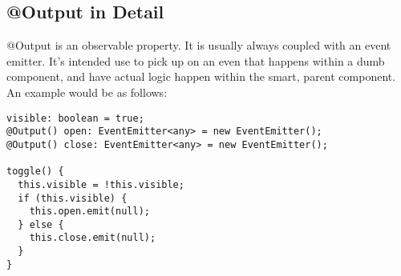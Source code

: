 \subsection{@Output in Detail}
@Output is an observable property. It is usually always coupled with an
event emitter. It's intended use to pick up on an even that happens within a
dumb component, and have actual logic happen within the smart, parent component.
An example would be as follows:
\begin{lstlisting}
visible: boolean = true;
@Output() open: EventEmitter<any> = new EventEmitter();
@Output() close: EventEmitter<any> = new EventEmitter();

toggle() {
  this.visible = !this.visible;
  if (this.visible) {
    this.open.emit(null);
  } else {
    this.close.emit(null);
  }
}
\end{lstlisting}
